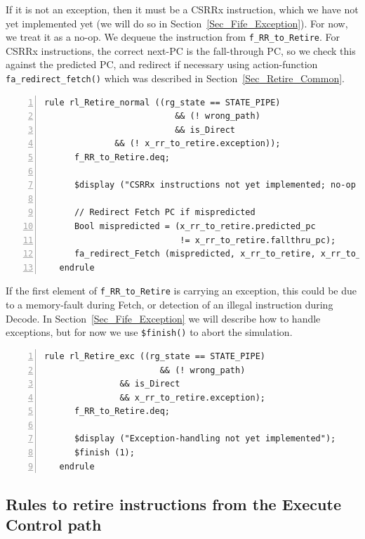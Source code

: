 If it is not an exception, then it must be a CSRRx instruction, which
we have not yet implemented yet (we will do so in
Section~\ref{Sec_Fife_Exception}).  For now, we treat it as a no-op.  We
dequeue the instruction from \verb|f_RR_to_Retire|.  For CSRRx
instructions, the correct next-PC is the fall-through PC, so we check
this against the predicted PC, and redirect if necessary using
action-function \verb|fa_redirect_fetch()| which was described in
Section~\ref{Sec_Retire_Common}.

{\small
\begin{Verbatim}[frame=single, numbers=left, label=(In file:src\_Fife/S5\_Retire.bsv)]
   rule rl_Retire_normal ((rg_state == STATE_PIPE)
                          && (! wrong_path)
                          && is_Direct
			  && (! x_rr_to_retire.exception));
      f_RR_to_Retire.deq;

      $display ("CSRRx instructions not yet implemented; no-op for now");

      // Redirect Fetch PC if mispredicted
      Bool mispredicted = (x_rr_to_retire.predicted_pc
                           != x_rr_to_retire.fallthru_pc);
      fa_redirect_Fetch (mispredicted, x_rr_to_retire, x_rr_to_retire.fallthru_pc);
   endrule
\end{Verbatim}
}

If the first element of \verb|f_RR_to_Retire| is carrying an
exception, this could be due to a memory-fault during Fetch, or
detection of an illegal instruction during Decode.  In
Section~\ref{Sec_Fife_Exception} we will describe how to handle
exceptions, but for now we use \verb|$finish()| to abort the
simulation.

{\small
\begin{Verbatim}[frame=single, numbers=left, label=(In file:src\_Fife/S5\_Retire.bsv)]
   rule rl_Retire_exc ((rg_state == STATE_PIPE)
                       && (! wrong_path)
		       && is_Direct
		       && x_rr_to_retire.exception);
      f_RR_to_Retire.deq;

      $display ("Exception-handling not yet implemented");
      $finish (1);
   endrule
\end{Verbatim}
}


\subsection{Rules to retire instructions from the Execute Control path}


